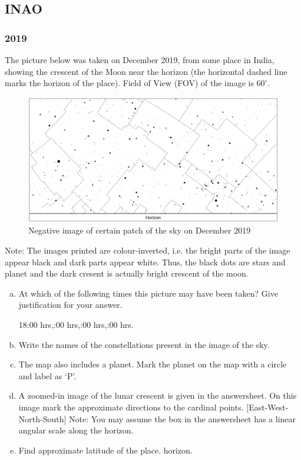 \documentclass[a4paper,12pt]{extarticle}
\begin{document}
\subsection{INAO}

\subsubsection{2019}

The picture below was taken on  December 2019, from some place in India, showing the crescent of the Moon near the horizon (the horizontal dashed line marks the horizon of the place). Field of View (FOV) of the image is $60^\circ$.
\begin{figure}[H]
    \centering
    \includegraphics[width=0.9\linewidth]{INAO_19.png}
    \caption{Negative image of certain patch of the sky on  December 2019}
\end{figure}
Note: The images printed are colour-inverted, i.e. the bright parts of the image appear black and dark parts appear white. Thus, the black dots are stars and planet and the dark cresent is actually bright crescent of the moon.
\begin{enumerate}[a.]
    \item At which of the following times this picture may have been taken? Give justification for your answer.
    \begin{center}
    18:00 hrs,:00 hrs,:00 hrs,:00 hrs. 
    \end{center}
    \item Write the names of the constellations present in the image of the sky.
    \item The map also includes a planet. Mark the planet on the map with a circle and label as `P'.
    \item A zoomed-in image of the lunar crescent is given in the answersheet. On this image mark the approximate directions to the cardinal points. [East-West-North-South] Note: You may assume the box in the answersheet has a linear angular scale along the horizon.
    \item Find approximate latitude of the place.
horizon.
\end{enumerate}
\end{document}
